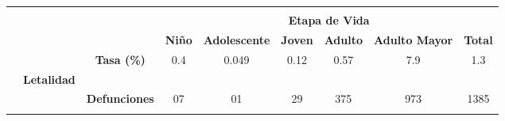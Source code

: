 	\begin{tabular}{ccc|cccccc|}
		\cline{4-9}
		\multicolumn{1}{l}{} &
		&
		&
		\multicolumn{6}{c|}{\cellcolor[HTML]{F2F2F2}} \\ 
		\multicolumn{1}{l}{} &
		\multicolumn{1}{l}{} &
		\multicolumn{1}{l|}{} 
		&\multicolumn{6}{c|}{\multirow{-2}{*}{\cellcolor[HTML]{F2F2F2}\textbf{Etapa de Vida}}} \\ \cline{4-9} 
		\multicolumn{1}{l}{} &
		\multicolumn{1}{l}{} &
		\multicolumn{1}{l|}{} &
		\multicolumn{1}{c|}{\cellcolor[HTML]{F2F2F2}\textbf{Niño}} &
		\multicolumn{1}{l|}{\cellcolor[HTML]{F2F2F2}\textbf{Adolescente}} &
		\multicolumn{1}{l|}{\cellcolor[HTML]{F2F2F2}\textbf{Joven}} &
		\multicolumn{1}{l|}{\cellcolor[HTML]{F2F2F2}\textbf{Adulto}} &
		\multicolumn{1}{l|}{\cellcolor[HTML]{F2F2F2}\textbf{Adulto Mayor}} &
		\cellcolor[HTML]{F2F2F2}\textbf{Total} \\ \hline
		\rowcolor[HTML]{ECF4FF} 
		\multicolumn{1}{|c|}{\cellcolor[HTML]{ECF4FF}} &
		\multicolumn{1}{c|}{\cellcolor[HTML]{ECF4FF}} &
		\textbf{Tasa (\%)} &
		\multicolumn{1}{c|}{\cellcolor[HTML]{ECF4FF}0.4} &
		\multicolumn{1}{c|}{\cellcolor[HTML]{ECF4FF}0.049} &
		\multicolumn{1}{c|}{\cellcolor[HTML]{ECF4FF}0.12} &
		\multicolumn{1}{c|}{\cellcolor[HTML]{ECF4FF}0.57} &
		\multicolumn{1}{c|}{\cellcolor[HTML]{ECF4FF}7.9} &
		1.3 \\ \cline{3-9} 
		\rowcolor[HTML]{ECF4FF} 
		\multicolumn{1}{|c|}{\cellcolor[HTML]{ECF4FF}} &
		\multicolumn{1}{c|}{\multirow{-2}{*}{\cellcolor[HTML]{ECF4FF}\textbf{Letalidad}}} &
		\cellcolor[HTML]{ECF4FF} &
		\multicolumn{1}{c|}{\cellcolor[HTML]{ECF4FF}} &
		\multicolumn{1}{c|}{\cellcolor[HTML]{ECF4FF}} &
		\multicolumn{1}{c|}{\cellcolor[HTML]{ECF4FF}} &
		\multicolumn{1}{c|}{\cellcolor[HTML]{ECF4FF}} &
		\multicolumn{1}{c|}{\cellcolor[HTML]{ECF4FF}} &
		\cellcolor[HTML]{ECF4FF} \\ \cline{2-2}
		\rowcolor[HTML]{ECF4FF} 
		\multicolumn{1}{|c|}{\cellcolor[HTML]{ECF4FF}} &
		\multicolumn{1}{c|}{\cellcolor[HTML]{ECF4FF}} &
		\multirow{-2}{*}{\cellcolor[HTML]{ECF4FF}\textbf{Defunciones}} &
		\multicolumn{1}{c|}{\multirow{-2}{*}{\cellcolor[HTML]{ECF4FF}07}} &
		\multicolumn{1}{c|}{\multirow{-2}{*}{\cellcolor[HTML]{ECF4FF}01}} &
		\multicolumn{1}{c|}{\multirow{-2}{*}{\cellcolor[HTML]{ECF4FF}29}} &
		\multicolumn{1}{c|}{\multirow{-2}{*}{\cellcolor[HTML]{ECF4FF}375}} &
		\multicolumn{1}{c|}{\multirow{-2}{*}{\cellcolor[HTML]{ECF4FF}973}} &
		\multirow{-2}{*}{\cellcolor[HTML]{ECF4FF}1385} \\ \cline{3-9} 
		\rowcolor[HTML]{ECF4FF} 

\end{tabular}
